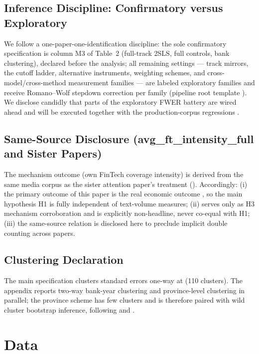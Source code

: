 \subsection{Inference Discipline: Confirmatory versus Exploratory}
We follow a one-paper-one-identification discipline: the sole confirmatory specification is
column M3 of Table~2 (full-track 2SLS, full controls, bank clustering), declared before the
analysis; all remaining settings --- track mirrors, the cutoff ladder, alternative
instruments, weighting schemes, and cross-model/cross-method measurement families --- are
labeled exploratory families and receive Romano--Wolf stepdown correction per family
\parencite{romano2005stepdown} (pipeline root template
). We disclose candidly that parts of the exploratory
FWER battery are wired ahead and will be executed together with the production-corpus
regressions .

\subsection{Same-Source Disclosure (avg\_ft\_intensity\_full and Sister Papers)}
The mechanism outcome  (own FinTech coverage intensity) is
derived from the same media corpus as the sister attention paper's treatment
(). Accordingly: (i) the primary outcome of this paper is the
real economic outcome , so the main hypothesis H1 is fully independent of
text-volume measures; (ii)  serves only as H3 mechanism
corroboration and is explicitly non-headline, never co-equal with H1; (iii) the same-source
relation is disclosed here to preclude implicit double counting across papers.

\subsection{Clustering Declaration}
The main specification clusters standard errors one-way at  (110 clusters). The
appendix reports two-way bank-year clustering and province-level clustering in parallel; the
province scheme has few clusters and is therefore paired with wild cluster bootstrap
inference, following \textcite{mackinnon2023cluster} and \textcite{cameron2015practitioner}.

\section{Data}\label{sec:data}


